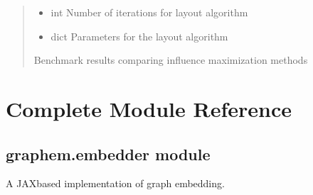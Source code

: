 \documentclass[letterpaper,10pt,english]{sphinxmanual}
\begin{document}
\begin{fulllineitems}
\begin{quote}
\begin{description}
\begin{itemize}
\item {} 
\sphinxAtStartPar
{} \textendash{} int
Number of iterations for layout algorithm

\item {} 
\sphinxAtStartPar
{} \textendash{} dict
Parameters for the layout algorithm

\end{itemize}

\sphinxAtStartPar
Benchmark results comparing influence maximization methods

\sphinxAtStartPar
{}

\end{description}\end{quote}

\end{fulllineitems}



\section{Complete Module Reference}
\label{\detokenize{api_reference:complete-module-reference}}

\subsection{graphem.embedder module}
\label{\detokenize{api_reference:module-graphem.embedder}}\label{\detokenize{api_reference:graphem-embedder-module}}
\sphinxAtStartPar
A JAX\sphinxhyphen{}based implementation of graph embedding.
\end{document}

